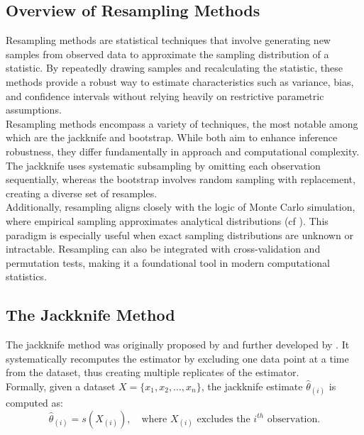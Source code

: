 \documentclass[aodsor,preprint]{imsart}
\numberwithin{equation}{section}
\theoremstyle{plain}
\begin{document}
\subsection{Overview of Resampling Methods}

Resampling methods are statistical techniques that involve generating new samples from observed data to approximate the sampling distribution of a statistic. By repeatedly drawing samples and recalculating the statistic, these methods provide a robust way to estimate characteristics such as variance, bias, and confidence intervals without relying heavily on restrictive parametric assumptions. \\

Resampling methods encompass a variety of techniques, the most notable among which are the jackknife and bootstrap. While both aim to enhance inference robustness, they differ fundamentally in approach and computational complexity. The jackknife uses systematic subsampling by omitting each observation sequentially, whereas the bootstrap involves random sampling with replacement, creating a diverse set of resamples. \\

Additionally, resampling aligns closely with the logic of Monte Carlo simulation, where empirical sampling approximates analytical distributions (cf \cite{efron1982jackknife,efron1993introduction,shao1995jackknife}). This paradigm is especially useful when exact sampling distributions are unknown or intractable. Resampling can also be integrated with cross-validation and permutation tests, making it a foundational tool in modern computational statistics.  \\

\subsection{The Jackknife Method}

The jackknife method was originally proposed by \cite{quenouille1949} and further developed by \cite{tukey1958bias}. It systematically recomputes the estimator by excluding one data point at a time from the dataset, thus creating multiple replicates of the estimator. \\

Formally, given a dataset \( X = \{x_1, x_2, \dots, x_n\} \), the jackknife estimate \( \hat{\theta}_{(i)} \) is computed as:
\[
\hat{\theta}_{(i)} = s(X_{(i)}), \quad \text{where } X_{(i)} \text{ excludes the } i^{th} \text{ observation}.
\]
\end{document}

